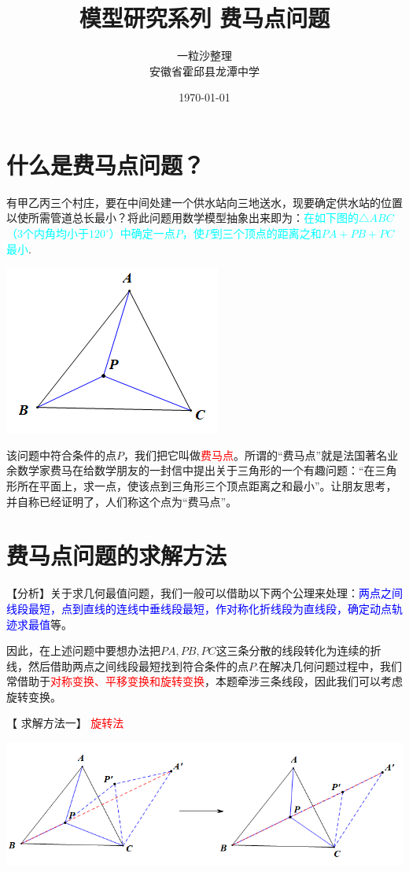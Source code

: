 \documentclass[10pt]{ctexart}
\title{模型研究系列 \quad 费马点问题}
\author{一粒沙整理\\安徽省霍邱县龙潭中学}
\date{\today}
\begin{document}
\maketitle
\tableofcontents


\section{什么是费马点问题？}
有甲乙丙三个村庄，要在中间处建一个供水站向三地送水，现要确定供水站的位置以使所需管道总长最小？将此问题用数学模型抽象出来即为：\textcolor{cyan}{在如下图的$\triangle ABC$（3个内角均小于$120^\circ$）中确定一点$P$，使$P$到三个顶点的距离之和$PA+PB+PC$最小}.

	\begin{center}
		\includegraphics[scale=0.6]{figure/feimadian01}
	\end{center}

该问题中符合条件的点$P$，我们把它叫做\textcolor{red}{费马点}。所谓的“费马点”就是法国著名业余数学家费马在给数学朋友的一封信中提出关于三角形的一个有趣问题：“在三角形所在平面上，求一点，使该点到三角形三个顶点距离之和最小”。让朋友思考，并自称已经证明了，人们称这个点为“费马点”。

\section{费马点问题的求解方法}
【分析】关于求几何最值问题，我们一般可以借助以下两个公理来处理：\textcolor{blue}{两点之间线段最短，点到直线的连线中垂线段最短，作对称化折线段为直线段，确定动点轨迹求最值}等。

因此，在上述问题中要想办法把$PA,PB,PC$这三条分散的线段转化为连续的折线，然后借助两点之间线段最短找到符合条件的点$P$.在解决几何问题过程中，我们常借助于\textcolor{red}{对称变换、平移变换和旋转变换}，本题牵涉三条线段，因此我们可以考虑旋转变换。

【 求解方法一】 \textcolor{red}{旋转法}

\begin{center}
	\includegraphics[scale=0.6]{figure/feimadian02}
\end{center}
\end{document}
